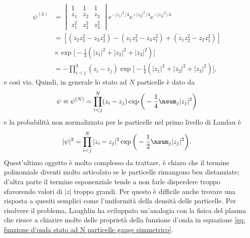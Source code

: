 \begin{equation}
    \begin{split}
        \psi^{(3)} &= 
        \begin{vmatrix}
            1 & 1 & 1 \\
            z_1 & z_2 & z_3 \\
            z_1^2 & z_2^2 & z_3^2
        \end{vmatrix} 
        e^{-|z_1|^2/4}e^{-|z_2|^2/4}e^{-|z_3|^2/4} \\
        &= [(z_2z_3^2 - z_3z_2^2) - (z_1z_3^2 - z_3z_1^2) + (z_1z_2^2 - z_2z_1^2)] \\
        &\times\exp{\bigg[-\frac{1}{4}(|z_1|^2 + |z_2|^2 + |z_3|^2)\bigg]} \\
        &= -\prod_{i<j}^3(z_i - z_j)\exp{\bigg[-\frac{1}{4}(|z_1|^2 + |z_2|^2 + |z_3|^2)\bigg]},
    \end{split}
\end{equation}
e così via. Quindi, in generale lo stato ad $N$ particelle è dato da
\begin{equation}
\label{eq: funzione d'onda stato ad N particelle gauge simmetrico}
    \psi \equiv \psi^{(N)} = \prod_{i<j}^N(z_i - z_j)\exp{\bigg(-\frac{1}{4}\nsum_j|z_j|^2\bigg)}
\end{equation}
e la probabilità non normalizzata per le particelle nel primo livello di Landau è
\begin{equation}
\label{eq: densità funzione d'onda stato ad N particelle gauge simmetrico}
    |\psi|^2 = \prod_{i<j}^N|z_i - z_j|^2\exp{\bigg(-\frac{1}{2}\nsum_j|z_j|^2\bigg)}.
\end{equation}
Quest'ultimo oggetto è molto complesso da trattare, è chiaro che il termine polinomiale diventi molto articolato se le particelle rimangono ben distanziate; d'altra parte il termine esponenziale tende a non farle disperdere troppo sfavorendo valori di $|z|$ troppo grandi. Per questo è difficile anche trovare una risposta a quesiti semplici come l'uniformità della densità delle particelle. Per risolvere il problema, Laughlin ha sviluppato un'analogia con la fisica del plasma che riesce a chiarire molte delle proprietà della funzione d'onda in equazione \eqref{eq: funzione d'onda stato ad N particelle gauge simmetrico}.

